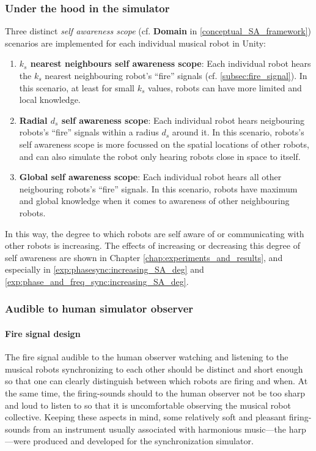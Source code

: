 	

		\subsubsection{Under the hood in the simulator}
		\label{SA_scopes_implemented}
		
		Three distinct \textit{self awareness scope} (cf. \textbf{Domain} in \ref{conceptual_SA_framework}) scenarios are implemented for each individual musical robot in Unity:
		
		\begin{enumerate}
			\item \textbf{$k_s$ nearest neighbours self awareness scope}: Each individual robot hears the $k_s$ nearest neighbouring robot's ``fire'' signals (cf. \ref{subsec:fire_signal}). In this scenario, at least for small $k_s$ values, robots can have more limited and local knowledge.
			\item \textbf{Radial $d_s$ self awareness scope}: Each individual robot hears neigbouring robots's ``fire'' signals within a radius $d_s$ around it. In this scenario, robots's self awareness scope is more focussed on the spatial locations of other robots, and can also simulate the robot only hearing robots close in space to itself.
			\item \textbf{Global self awareness scope}: Each individual robot hears all other neigbouring robots's ``fire'' signals. In this scenario, robots have maximum and global knowledge when it comes to awareness of other neighbouring robots.
		\end{enumerate}
		
		In this way, the degree to which robots are self aware of or communicating with other robots is increasing. The effects of increasing or decreasing this degree of self awareness are shown in Chapter \ref{chap:experiments_and_results}, and especially in \ref{exp:phasesync:increasing_SA_deg} and \ref{exp:phase_and_freq_sync:increasing_SA_deg}.
		

		\subsubsection{Audible to human simulator observer}
		\label{human_audible_fire_signals}

			\paragraph{Fire signal design}
			The fire signal audible to the human observer watching and listening to the musical robots synchronizing to each other should be distinct and short enough so that one can clearly distinguish between which robots are firing and when. At the same time, the firing-sounds should to the human observer not be too sharp and loud to listen to so that it is uncomfortable observing the musical robot collective. Keeping these aspects in mind, some relatively soft and pleasant firing-sounds from an instrument usually associated with harmonious music—the harp—were produced and developed for the synchronization simulator.
			
